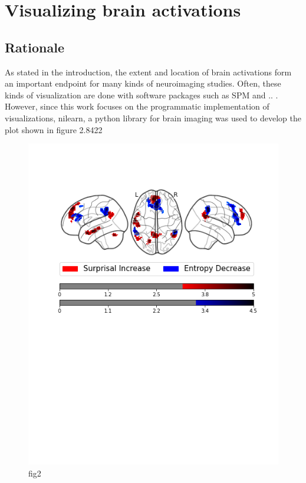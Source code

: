 \documentclass[12pt, letterpaper]{article}
\begin{document}
\section{Visualizing brain activations}

\subsection{Rationale}
As stated in the introduction, the extent and location of brain activations form an important endpoint for many kinds of neuroimaging studies.
Often, these kinds of visualization are done with software packages such as SPM and .. . 
However, since this work focuses on the programmatic implementation of visualizations, nilearn, a python library for brain imaging was used to develop the plot shown in figure 2.8422

\begin{figure}
  \includegraphics[width=\linewidth]{Figure2.png}
  \caption{fig2}
  \label{fig:1}
\end{figure}
\end{document}
